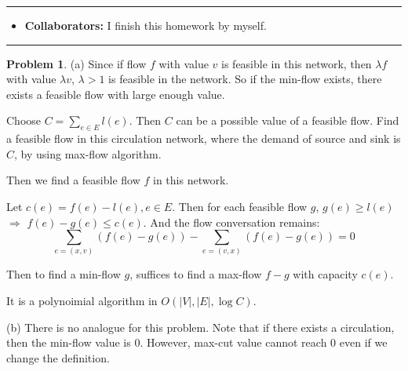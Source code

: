\documentclass[a4paper]{article}
\theoremstyle{definition}
\newtheorem{problem}{Problem}
\theoremstyle{plain}
\newcommand{\dps}{\displaystyle}
\numberwithin{equation}{problem}
\begin{document}
\courseheader
{}
\rule{\textwidth}{1pt}
\begin{itemize}
\item {\bf Collaborators: \/}
  I finish this homework by myself. 
\end{itemize}
\rule{\textwidth}{1pt}

\vspace{2em}
 
\sloppy
{}

\begin{problem}
    (a) Since if flow $ f $  with value  $ v $ is feasible in this network, then  $ \lambda f $ with value  $ \lambda v $,  $ \lambda>1 $ is feasible in the network. So if the min-flow exists, there exists a feasible flow with large enough value.  


    Choose  $ C=\dps\sum_{e\in E}l(e) $. Then  $ C $ can be a possible value of a feasible flow. Find a feasible flow in this circulation network, where the demand of source and sink is  $ C $, by using max-flow algorithm.
    
    Then we find a feasible flow $ f $  in this network.

    Let  $ c(e)=f(e)-l(e),e\in E $. Then for each feasible flow  $g $,  $ g(e) \geq l(e) $  $ \Rightarrow  $  $ f(e)-g(e) \leq c(e) $. And the flow conversation remains:
    \[\sum_{e=(x,v)}(f(e)-g(e))-\sum_{e=(v,x)}(f(e)-g(e))=0\]   

    Then to find a min-flow  $ g $, suffices to find a max-flow  $ f-g $  with capacity  $ c(e) $.
    
    It is a polynoimial algorithm in  $ O(|V|,|E|,\log C) $.
    
    (b)
    There is no analogue for this problem. Note that if there exists a circulation, then the min-flow value is 0. However, max-cut value cannot reach  $ 0 $ even if we change the definition. 
\end{problem}
\end{document}
